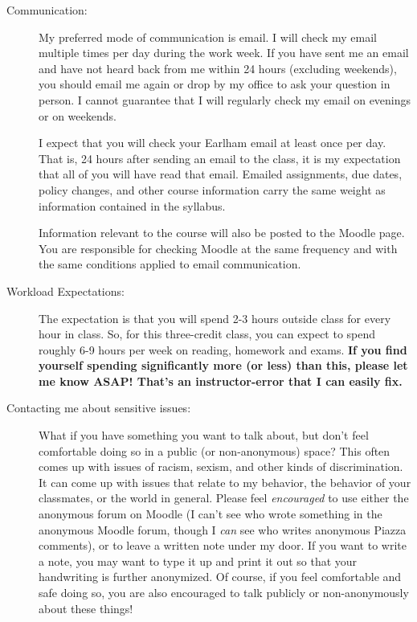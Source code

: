 \documentclass[12pt]{article}
\begin{document}
{\begin{description}
  \item[Communication:] My preferred mode of communication is email. I
        will check my email multiple times per day during the work
        week. If you have sent me an email and have not heard back
        from me within 24 hours (excluding weekends), you should email
        me again or drop by my office to ask your question in
        person. I cannot guarantee that I will regularly check my
        email on evenings or on weekends. 
  
        I expect that you will check your Earlham email at least once per
        day. That is, 24 hours after sending an email to the class, it
        is my expectation that all of you will have read that
        email. Emailed assignments, due dates, policy changes, and
        other course information carry the same weight as information
        contained in the syllabus. 

        Information relevant to the course will also be posted to the Moodle
        page. You are responsible for checking Moodle at the same
        frequency and with the same conditions applied to email
        communication. 
  \item[Workload Expectations:] The expectation is that you will spend
        2-3 hours outside class for every hour in class. So, for this
        three-credit class, you can expect to spend roughly 6-9 hours
        per week on reading, homework and exams. \textbf{If you find
        yourself spending significantly more (or less) than this,
        please let me know ASAP! That's an instructor-error that I can
        easily fix.}
        
  \item[Contacting me about sensitive issues:] What if you have
        something you want to talk about, but don't feel comfortable
        doing so in a public (or non-anonymous) space? This often
        comes up with issues of racism, sexism, and other kinds of
        discrimination. It can come up with issues that relate to my
        behavior, the behavior of your classmates, or the world in
        general. Please feel {\it encouraged} to use either the
        anonymous forum on Moodle (I can't see who wrote something in
        the anonymous Moodle forum, though I {\it can} see who writes
        anonymous Piazza comments), or to leave a written note under
        my door. If you want to write a note, you may want to type it
        up and print it out so that your handwriting is further
        anonymized. Of course, if you feel comfortable and safe doing
        so, you are also encouraged to talk publicly or
        non-anonymously about these things! 


\end{description}}
\end{document}
